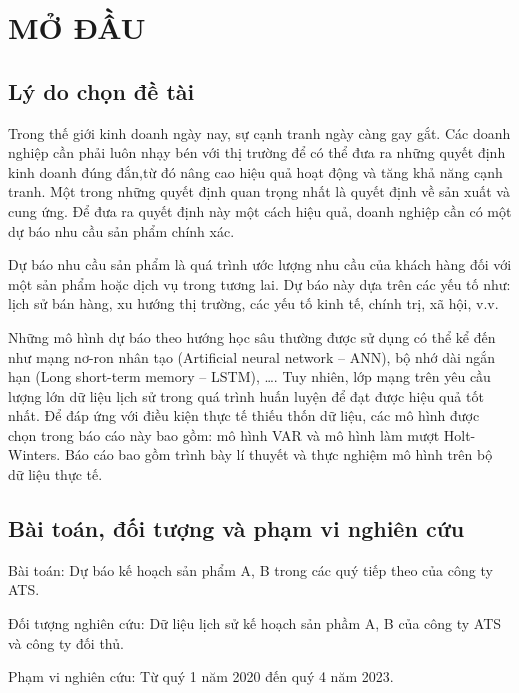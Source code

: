 \setcounter{page}{1}
\chapter{MỞ ĐẦU}
\section{Lý do chọn đề tài}

Trong thế giới kinh doanh ngày nay, sự cạnh tranh ngày càng gay gắt. Các doanh nghiệp cần phải luôn nhạy bén với thị trường để có thể đưa ra những quyết định kinh doanh đúng đắn,từ đó nâng cao hiệu quả hoạt động và tăng khả năng cạnh tranh. Một trong những quyết định quan trọng nhất là quyết định về sản xuất và cung ứng. Để đưa ra quyết định này một cách hiệu quả, doanh nghiệp cần có một dự báo nhu cầu sản phẩm chính xác.

Dự báo nhu cầu sản phẩm là quá trình ước lượng nhu cầu của khách hàng đối với một sản phẩm hoặc dịch vụ trong tương lai. Dự báo này dựa trên các yếu tố như: lịch sử bán hàng, xu hướng thị trường, các yếu tố kinh tế, chính trị, xã hội, v.v.

Những mô hình dự báo theo hướng học sâu thường được sử dụng có thể kể đến như mạng nơ-ron nhân tạo (Artificial neural network – ANN), bộ nhớ dài ngắn hạn (Long short-term memory – LSTM), \dots. Tuy nhiên, lớp mạng trên yêu cầu lượng lớn dữ liệu lịch sử trong quá trình huấn luyện để đạt được hiệu quả tốt nhất. Để đáp ứng với điều kiện thực tế thiếu thốn dữ liệu, các mô hình được chọn trong báo cáo này bao gồm: mô hình VAR và mô hình làm mượt Holt-Winters. Báo cáo bao gồm trình bày lí thuyết và thực nghiệm mô hình trên bộ dữ liệu thực tế.

\section{Bài toán, đối tượng và phạm vi nghiên cứu}

Bài toán: Dự báo kế hoạch sản phẩm A, B trong các quý tiếp theo của công ty ATS.

Đối tượng nghiên cứu: Dữ liệu lịch sử kế hoạch sản phầm A, B của công ty ATS và công ty đối thủ.

Phạm vi nghiên cứu: Từ quý 1 năm 2020 đến quý 4 năm 2023.